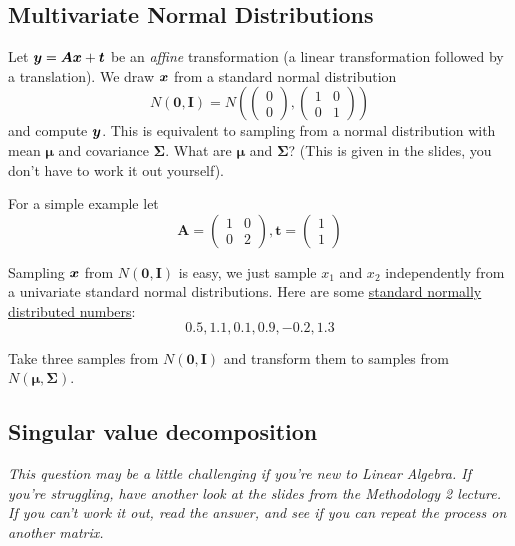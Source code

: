 \documentclass[11pt]{article}
\begin{document}
\subsection{Multivariate Normal Distributions}

Let ${\bm y} = {\bm A}{\bm x} + {\bm t}$ be an \emph{affine} transformation (a linear transformation followed by a translation). We draw ${\bm x}$ from a standard normal distribution
\[
N(\mathbf{0}, \mathbf{I}) = N\left( \begin{pmatrix}0 \\ 0\end{pmatrix}, \begin{pmatrix}1 & 0 \\ 0 & 1\end{pmatrix} \right)
\]
and compute ${\bm y}$. This is equivalent to sampling from a normal distribution with mean $\bm{\mu}$ and covariance $\bm{\Sigma}$. What are $\bm{\mu}$ and $\bm{\Sigma}$? (This is given in the slides, you don't have to work it out yourself).
\ans{
\[
\bm{\mu} = \bt, \;\;\; \bm{\Sigma} = \A\A^T
\]
}

For a simple example let 
\[
\mathbf{A} = \begin{pmatrix} 1 & 0 \\ 0 & 2\end{pmatrix}, \mathbf{t} = \begin{pmatrix} 1 \\ 1\end{pmatrix}
\]

Sampling ${\bm x}$ from $N(\bm{0}, \bm{I})$ is easy, we just sample $x_1$ and $x_2$ independently from a univariate standard normal distributions. Here are some \href{https://goo.gl/Jw7Hjm}{standard normally distributed numbers}:
\[
0.5, 1.1, 0.1, 0.9, -0.2, 1.3
\]

Take three samples from $N(\bm{0}, \bm{I})$ and transform them to samples from $N(\bm{\mu},\bm{\Sigma})$.


\subsection{Singular value decomposition}
\emph{This question may be a little challenging if you're new to Linear Algebra. If you're struggling, have another look at the slides from the \emph{Methodology 2} lecture. If you can't work it out, read the answer, and see if you can repeat the process on another matrix.}
\end{document}

